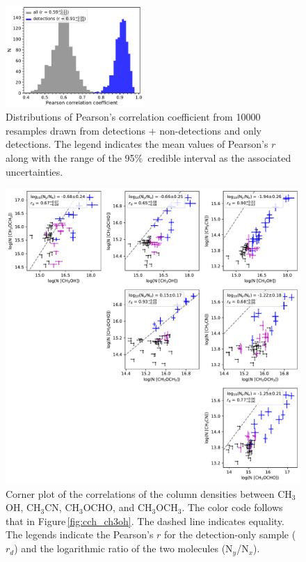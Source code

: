 \documentclass[twocolumn]{aastex62}
\newcommand{\methylformate}{\mbox{CH$_{3}$OCHO}}
\newcommand{\methanol}{\mbox{CH$_{3}$OH}}
\newcommand{\dimethylether}{\mbox{CH$_{3}$OCH$_{3}$}}
\newcommand{\methylcyanide}{\mbox{CH$_{3}$CN}}
\begin{document}
\begin{figure}[htbp!]
  \centering
  \includegraphics[width=0.47\textwidth]{pearson_r_ch3oh_ch3cn.pdf}
  \caption{Distributions of Pearson's correlation coefficient from 10000 resamples drawn from detections $+$ non-detections and only detections.  The legend indicates the mean values of Pearson's $r$ along with the range of the 95\%\ credible interval as the associated uncertainties.}
  \label{fig:pearson_distribution}
\end{figure}

\begin{figure}[htbp!]
  \centering
  \includegraphics[width=\textwidth]{corner_Ncol_correlations.pdf}
  \caption{Corner plot of the correlations of the column densities between \methanol, \methylcyanide, \methylformate, and \dimethylether.  The color code follows that in Figure\,\ref{fig:cch_ch3oh}.  The dashed line indicates equality.  The legends indicate the Pearson's $r$ for the detection-only sample ($r_{d}$) and the logarithmic ratio of the two molecules (N$_{y}$/N$_{x}$).}
  \label{fig:corner}
\end{figure}
\end{document}
